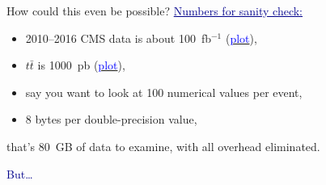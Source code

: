 \documentclass{beamer}
\begin{document}
\begin{frame}{How could this even be possible?}
\vspace{0.5 cm}
\large \textcolor{darkblue}{\underline{Numbers for sanity check:}}
\begin{itemize}
\item 2010--2016 CMS data is about 100~fb$^{-1}$ (\href{http://cms-service-lumi.web.cern.ch/cms-service-lumi/publicplots/int_lumi_cumulative_pp_1.png}{\textcolor{blue}{plot}}),
\item $t\bar{t}$ is 1000~pb (\href{https://atlas.web.cern.ch/Atlas/GROUPS/PHYSICS/CombinedSummaryPlots/SM/ATLAS_p_SMSummary_SqrtS_Zoom/ATLAS_p_SMSummary_SqrtS_Zoom.png}{\textcolor{blue}{plot}}),
\item say you want to look at 100 numerical values per event,
\item 8 bytes per double-precision value,
\end{itemize}
that's 80~GB of data to examine, with all overhead eliminated.

\vspace{0.5 cm}

\vspace{0.2 cm}

\vspace{0.2 cm}
\end{frame}

\begin{frame}{}
\begin{center}
\textcolor{darkblue}{\huge But\ldots}
\end{center}
\end{frame}
\end{document}
